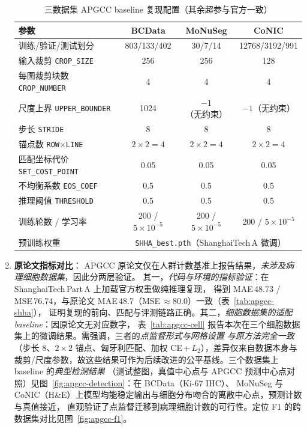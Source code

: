 \begin{enumerate}
    \begin{table}[H]
    \centering
    \caption{三数据集 APGCC baseline 复现配置（其余超参与官方一致）}
    \label{tab:apgcc-cfg}
    \begin{tabular}{lccc}
    \toprule
    参数 & BCData & MoNuSeg & CoNIC \\
    \midrule
    训练/验证/测试划分      & 803/133/402 & 30/7/14 & 12768/3192/991 \\
    输入裁剪 \texttt{CROP\_SIZE} & 256 & 256 & 128 \\
    每图裁剪块数 \texttt{CROP\_NUMBER} & 4 & 4 & 4 \\
    尺度上界 \texttt{UPPER\_BOUNDER} & 1024 & $-1$（无约束） & $-1$（无约束） \\
    步长 \texttt{STRIDE}    & 8 & 8 & 8 \\
    锚点数 \texttt{ROW$\times$LINE} & $2{\times}2{=}4$ & $2{\times}2{=}4$ & $2{\times}2{=}4$ \\
    匹配坐标代价 \texttt{SET\_COST\_POINT} & 0.05 & 0.05 & 0.05 \\
    不均衡系数 \texttt{EOS\_COEF} & 0.5 & 0.5 & 0.5 \\
    推理阈值 \texttt{THRESHOLD} & 0.5 & 0.5 & 0.5 \\
    训练轮数 / 学习率       & 200 / $5{\times}10^{-5}$ & 200 / $5{\times}10^{-5}$ & 200 / $5{\times}10^{-5}$ \\
    预训练权重              & \multicolumn{3}{c}{\texttt{SHHA\_best.pth}（ShanghaiTech\,A 微调）} \\
    \bottomrule
    \end{tabular}
    \end{table}

    \item \textbf{原论文指标对比}：
    APGCC 原论文仅在人群计数基准上报告结果，\emph{未涉及病理细胞数据集}，因此分两层验证。
    其一，\emph{代码与环境的指标验证}：在 ShanghaiTech\,Part\,A 上加载官方权重做纯推理复现，
    得到 MAE\,$48.73$ / MSE\,$76.74$，与原论文 MAE\,$48.7$（MSE\,$\approx 80.0$）一致（表~\ref{tab:apgcc-shha}），
    证明复现的前向、匹配与评测链路正确。其二，\emph{细胞数据集的适配 baseline}：因原论文无对应数字，
    表~\ref{tab:apgcc-cell} 报告本次在三个细胞数据集上的微调结果。需强调，三者的\emph{点监督形式与网格设置
    与原方法完全一致}（步长 $8$、$2{\times}2$ 锚点、匈牙利匹配、加权 CE\,+\,$L_2$），差异仅来自数据本身与
    裁剪/尺度参数，故这些结果可作为后续改进的公平基线。三个数据集上 baseline 的\emph{典型检测结果}
    （测试整图，真值中心点与 APGCC 预测中心点对照）见图~\ref{fig:apgcc-detection}：在 BCData（Ki-67 IHC）、
    MoNuSeg 与 CoNIC（H\&E）上模型均能稳定输出与细胞分布吻合的离散中心点，预测计数与真值接近，
    直观验证了点监督迁移到病理细胞计数的可行性。定位 F1 的跨数据集对比见图~\ref{fig:apgcc-f1}。


\end{enumerate}
